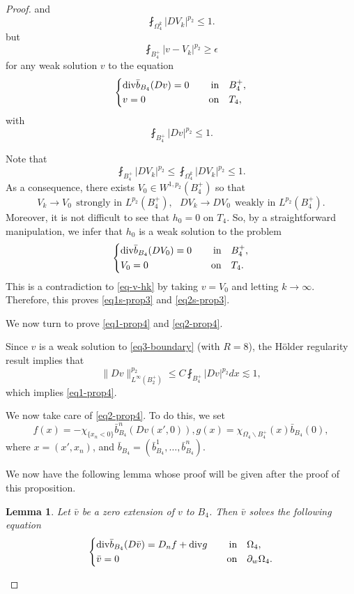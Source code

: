 \documentclass[a4paper,10pt]{amsart}
\newtheorem{lem}[thm]{Lemma}
\newcommand{\lesi}{\lesssim}
\newcommand{\Om}{\Omega}
\newcommand{\vc}{\infty}
\newcommand{\di}{{\rm div}}
\begin{document}
\begin{proof}
	and
	$$
	\fint_{\Om_4^k}|DV_k|^{p_2}\leq 1.
	$$
	but
	\begin{equation}\label{eq-v-hk}
	\fint_{B_4^+}|v-V_k|^{p_2}\geq\epsilon
	\end{equation}
	for any weak solution $v$ to the equation
	\begin{equation}\label{eq3k-boundary}
	\left\{
	\begin{aligned}
	&\di \bar{b}_{B_4}(Dv)=0 \quad &\text{in}& \quad B_4^+,\\
	&v=0  \quad &\text{on}& \quad T_4,
	\end{aligned}
	\right.
	\end{equation}
	with $$
	\fint_{B_4^+}|Dv|^{p_2}\leq 1.
	$$
	
	Note that
	$$
	\fint_{B_4^+}|DV_k|^{p_2}\leq \fint_{\Om_4^k}|DV_k|^{p_2}\leq 1.
	$$
	As a consequence, there exists $V_0\in W^{1,p_2}(B_4^+)$ so that 
	$$
	V_k\to V_0 \ \ \text{strongly in $L^{p_2}(B_4^+)$}, \ \ \ DV_k\to DV_0 \ \ \text{weakly in $L^{p_2}(B_4^+)$}. 
	$$
	Moreover, it is not difficult to see that $h_0=0$ on $T_4$. So, by a straightforward manipulation, we infer that $h_0$ is a weak solution to the problem
	$$
	\left\{
	\begin{aligned}
		&\di \bar{b}_{B_4}(DV_0)=0 \quad &\text{in}& \quad B_4^+,\\
		&V_0=0  \quad &\text{on}& \quad T_4.
	\end{aligned}
	\right.
	$$
	This is a contradiction to \eqref{eq-v-hk} by taking $v=V_0$ and letting $k\to \vc$. Therefore, this proves \eqref{eq1s-prop3} and \eqref{eq2s-prop3}.


We now turn to prove \eqref{eq1-prop4} and \eqref{eq2-prop4}.

Since $v$ is a weak solution to \eqref{eq3-boundary} (with $R=8$), the H\"older regularity result implies that  
$$
\|D v\|^{p_2}_{L^\vc(B_2^+)}\leq  C\fint_{B_4^+}|Dv|^{p_2}dx\lesi 1,
$$
which implies \eqref{eq1-prop4}.

We now take care of \eqref{eq2-prop4}. To do this, we set 
$$
f(x)=-\chi_{\{x_n<0\}}\bar{b}^n_{B_4}(Dv(x',0)), g(x)=\chi_{\Om_{4}\backslash B_4^+}(x)\bar{b}_{B_4}(0),
$$
where $x=(x',x_n)$, and $\bar{b}_{B_4}=(\bar{b}^1_{B_4},\ldots,\bar{b}^n_{B_4})$. 

We now have the following lemma whose proof will be given after the proof of this proposition.
\begin{lem}\label{lem1}
Let  $\bar{v}$ be a zero extension of $v$ to $B_4$. Then  $\bar{v}$  solves the following equation
\begin{equation}\label{eq-bar v}
\left\{
\begin{aligned}
	&\di \bar{b}_{B_4}(D\bar{v})=D_nf +\di g\quad &\text{in}& \quad \Om_{4},\\
	&\bar{v}=0  \quad &\text{on}& \quad \partial_w \Om_{4}.
\end{aligned}
\right.
\end{equation}
\end{lem}


\end{proof}
\end{document}
